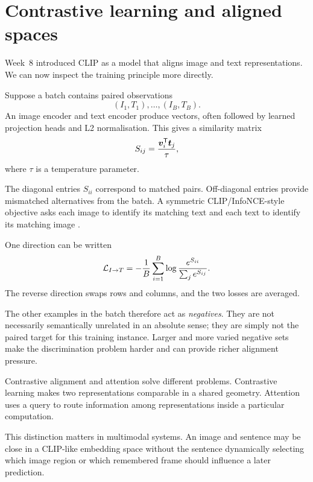 \section{Contrastive learning and aligned spaces}

Week~8 introduced CLIP as a model that aligns image and text representations. We can now inspect the training principle more directly.

Suppose a batch contains paired observations
\[
  (I_1,T_1),\ldots,(I_B,T_B).
\]
An image encoder and text encoder produce vectors, often followed by learned projection heads and L2 normalisation. This gives a similarity matrix
\[
  S_{ij}=\frac{\bm{v}^{\mathsf T}_i\bm{t}_j}{\tau},
\]
where \(\tau\) is a temperature parameter.

The diagonal entries \(S_{ii}\) correspond to matched pairs. Off-diagonal entries provide mismatched alternatives from the batch. A symmetric CLIP/InfoNCE-style objective asks each image to identify its matching text and each text to identify its matching image \parencite{radford2021clip}.

One direction can be written
\begin{equation}
  \mathcal{L}_{I\rightarrow T}
  = -\frac{1}{B}\sum_{i=1}^{B}
    \log\frac{e^{S_{ii}}}{\sum_j e^{S_{ij}}}.
\end{equation}
The reverse direction swaps rows and columns, and the two losses are averaged.

The other examples in the batch therefore act as \emph{negatives}. They are not necessarily semantically unrelated in an absolute sense; they are simply not the paired target for this training instance. Larger and more varied negative sets make the discrimination problem harder and can provide richer alignment pressure.

\begin{keyidea}
Contrastive alignment and attention solve different problems. Contrastive learning makes two representations comparable in a shared geometry. Attention uses a query to route information among representations inside a particular computation.
\end{keyidea}

This distinction matters in multimodal systems. An image and sentence may be close in a CLIP-like embedding space without the sentence dynamically selecting which image region or which remembered frame should influence a later prediction.

